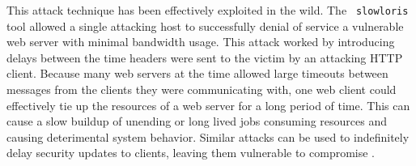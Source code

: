 This attack technique has been effectively exploited in the wild.  The {\tt 
slowloris} tool
allowed a single attacking host to successfully denial of service a vulnerable
web server with minimal bandwidth usage.  This attack worked by introducing
delays between the time headers were sent to the victim by an attacking HTTP
client.  Because many web servers at the time allowed large timeouts between
messages from the clients they were communicating with, one web client could
effectively tie up the resources of a web server for a long period of
time.
This can cause a slow buildup of unending or long
lived jobs consuming resources and causing deterimental system behavior.
 \cite{Slowloris}  Similar attacks can be used to indefinitely 
delay security updates to clients, leaving them vulnerable to compromise
.



